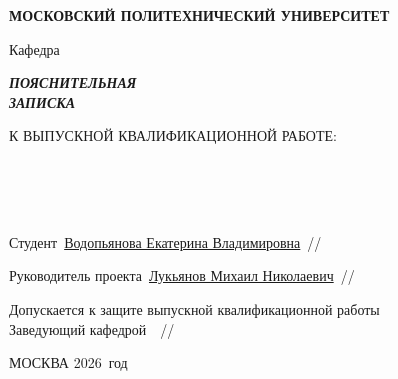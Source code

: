 \thispagestyle{empty}

\begin{center}
  \textbf{МОСКОВСКИЙ ПОЛИТЕХНИЧЕСКИЙ УНИВЕРСИТЕТ}
\end{center}

\vspace{0.6em}

\begin{center}
  Кафедра\hspace{1.6cm}\underline{}
\end{center}

\vspace{2.2em}

\begin{center}
  {\fontsize{28pt}{32pt}\selectfont\textbf{\textit{ПОЯСНИТЕЛЬНАЯ}}}\\[0.3em]
  {\fontsize{28pt}{32pt}\selectfont\textbf{\textit{ЗАПИСКА}}}
\end{center}

\vspace{1.4em}

\begin{center}
  {\fontsize{14pt}{16pt}\selectfont К ВЫПУСКНОЙ КВАЛИФИКАЦИОННОЙ РАБОТЕ:}
\end{center}

\vspace{0.6em}

\begin{center}
\underline{}\\[0.3em]
\underline{}\\[0.3em]
\underline{}\\[0.3em]
\underline{}
\end{center}

\vspace{2.4em}

\noindent Студент~\underline{Водопьянова Екатерина Владимировна\hfill}~/\underline{\hspace{3.2cm}}/

\vspace{2em}

\noindent Руководитель проекта~\underline{Лукьянов Михаил Николаевич\hfill}~/\underline{\hspace{3.2cm}}/

\vspace{2em}

\noindent Допускается к защите выпускной квалификационной работы\\[0.4em]
Заведующий кафедрой~\underline{\hfill}~/\underline{\hspace{3.2cm}}/

\vfill

\begin{center}
  МОСКВА 2026~год
\end{center}

\newpage
